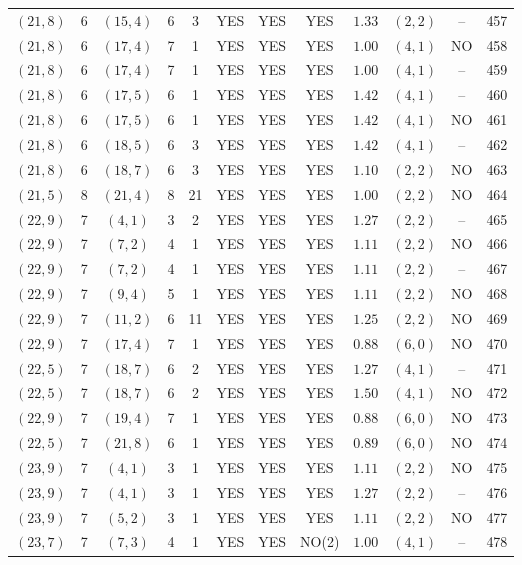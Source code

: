 \begin{longtable}{|c|c|c|c|c|c|c|c|c|c|c|c|}
$(21,8)$ & 6 & $(15,4)$ & 6 & 3 & YES & YES & YES & $1.33$ & $(2,2)$ & -- & 457\\
$(21,8)$ & 6 & $(17,4)$ & 7 & 1 & YES & YES & YES & $1.00$ & $(4,1)$ & NO & 458\\
$(21,8)$ & 6 & $(17,4)$ & 7 & 1 & YES & YES & YES & $1.00$ & $(4,1)$ & -- & 459\\
$(21,8)$ & 6 & $(17,5)$ & 6 & 1 & YES & YES & YES & $1.42$ & $(4,1)$ & -- & 460\\
$(21,8)$ & 6 & $(17,5)$ & 6 & 1 & YES & YES & YES & $1.42$ & $(4,1)$ & NO & 461\\
$(21,8)$ & 6 & $(18,5)$ & 6 & 3 & YES & YES & YES & $1.42$ & $(4,1)$ & -- & 462\\
$(21,8)$ & 6 & $(18,7)$ & 6 & 3 & YES & YES & YES & $1.10$ & $(2,2)$ & NO & 463\\
$(21,5)$ & 8 & $(21,4)$ & 8 & 21 & YES & YES & YES & $1.00$ & $(2,2)$ & NO & 464\\
$(22,9)$ & 7 & $(4,1)$ & 3 & 2 & YES & YES & YES & $1.27$ & $(2,2)$ & -- & 465\\
$(22,9)$ & 7 & $(7,2)$ & 4 & 1 & YES & YES & YES & $1.11$ & $(2,2)$ & NO & 466\\
$(22,9)$ & 7 & $(7,2)$ & 4 & 1 & YES & YES & YES & $1.11$ & $(2,2)$ & -- & 467\\
$(22,9)$ & 7 & $(9,4)$ & 5 & 1 & YES & YES & YES & $1.11$ & $(2,2)$ & NO & 468\\
$(22,9)$ & 7 & $(11,2)$ & 6 & 11 & YES & YES & YES & $1.25$ & $(2,2)$ & NO & 469\\
$(22,9)$ & 7 & $(17,4)$ & 7 & 1 & YES & YES & YES & $0.88$ & $(6,0)$ & NO & 470\\
$(22,5)$ & 7 & $(18,7)$ & 6 & 2 & YES & YES & YES & $1.27$ & $(4,1)$ & -- & 471\\
$(22,5)$ & 7 & $(18,7)$ & 6 & 2 & YES & YES & YES & $1.50$ & $(4,1)$ & NO & 472\\
$(22,9)$ & 7 & $(19,4)$ & 7 & 1 & YES & YES & YES & $0.88$ & $(6,0)$ & NO & 473\\
$(22,5)$ & 7 & $(21,8)$ & 6 & 1 & YES & YES & YES & $0.89$ & $(6,0)$ & NO & 474\\
$(23,9)$ & 7 & $(4,1)$ & 3 & 1 & YES & YES & YES & $1.11$ & $(2,2)$ & NO & 475\\
$(23,9)$ & 7 & $(4,1)$ & 3 & 1 & YES & YES & YES & $1.27$ & $(2,2)$ & -- & 476\\
$(23,9)$ & 7 & $(5,2)$ & 3 & 1 & YES & YES & YES & $1.11$ & $(2,2)$ & NO & 477\\
$(23,7)$ & 7 & $(7,3)$ & 4 & 1 & YES & YES & NO(2) & $1.00$ & $(4,1)$ & -- & 478\\

\end{longtable}
